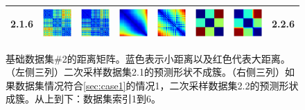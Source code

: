 \documentclass[bachelor, nocolorlinks, printoneside]{seuthesis} %
\begin{document}
\begin{Main}
\begin{figure}[ht!]
\begin{centering}
\begin{tabular}{cccc|cccc}
        2.1.6 &\includegraphics[width=0.12\columnwidth,keepaspectratio]{figs/toy_triangle/cluster_converge_3by30_6_1.png} &
        \includegraphics[width=0.12\columnwidth,keepaspectratio]{figs/toy_triangle/cluster_converge_3by30_6_2.png} &
        \includegraphics[width=0.12\columnwidth,keepaspectratio]{figs/toy_triangle/cluster_converge_3by30_6_3.png} &  
        \includegraphics[width=0.12\columnwidth,keepaspectratio]{figs/toy_triangle/cluster_converge_3by16_6_1.png} &
        \includegraphics[width=0.12\columnwidth,keepaspectratio]{figs/toy_triangle/cluster_converge_3by16_6_2.png} &
        \includegraphics[width=0.12\columnwidth,keepaspectratio]{figs/toy_triangle/cluster_converge_3by16_6_3.png}& 2.2.6\\
        \bottomrule  
        \end{tabular}  \vspace{-2mm}
        \caption{\small 基础数据集\#2的距离矩阵。蓝色表示小距离以及红色代表大距离。（左侧三列）二次采样数据集2.1的预测形状不成簇。（右侧三列）如果数据集情况符合\ref{sec:case1}的情况1，二次采样数据集2.2的预测形状成簇。从上到下：数据集索引1到6。}
        \label{fig:triangle_cluster_visualization}
    \end{centering}
    \end{figure}


\end{Main}
\end{document}
